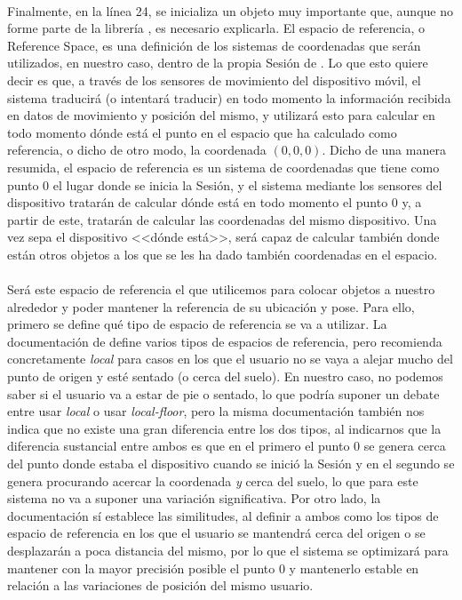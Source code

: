 \documentclass{subfiles}
\begin{document}
        \paragraph{}
        Finalmente, en la línea 24, se inicializa un objeto muy importante que, aunque no forme parte de la librería \threejs, es necesario explicarla. El espacio de referencia, o Reference Space, es una definición de los sistemas de coordenadas que serán utilizados, en nuestro caso, dentro de la propia Sesión de \ra \cite{web:webxr_referencespace}. Lo que esto quiere decir es que, a través de los sensores de movimiento del dispositivo móvil, el sistema traducirá (o intentará traducir) en todo momento la información recibida en datos de movimiento y posición del mismo, y utilizará esto para calcular en todo momento dónde está el punto en el espacio que ha calculado como referencia, o dicho de otro modo, la coordenada $(0,0,0)$. Dicho de una manera resumida, el espacio de referencia es un sistema de coordenadas que tiene como punto 0 el lugar donde se inicia la Sesión, y el sistema mediante los sensores del dispositivo tratarán de calcular dónde está en todo momento el punto 0 y, a partir de este, tratarán de calcular las coordenadas del mismo dispositivo. Una vez sepa el dispositivo <<dónde está>>, será capaz de calcular también donde están otros objetos a los que se les ha dado también coordenadas en el espacio.

        \paragraph{}
        Será este espacio de referencia el que utilicemos para colocar objetos a nuestro alrededor y poder mantener la referencia de su ubicación y pose. Para ello, primero se define qué tipo de espacio de referencia se va a utilizar. La documentación de \webxr define varios tipos de espacios de referencia, pero recomienda concretamente \textit{local} para casos en los que el usuario no se vaya a alejar mucho del punto de origen y esté sentado (o cerca del suelo). En nuestro caso, no podemos saber si el usuario va a estar de pie o sentado, lo que podría suponer un debate entre usar \textit{local} o usar \textit{local-floor}, pero la misma documentación también nos indica que no existe una gran diferencia entre los dos tipos, al indicarnos que la diferencia sustancial entre ambos es que en el primero el punto 0 se genera cerca del punto donde estaba el dispositivo cuando se inició la Sesión y en el segundo se genera procurando acercar la coordenada \textit{y} cerca del suelo, lo que para este sistema no va a suponer una variación significativa. Por otro lado, la documentación sí establece las similitudes, al definir a ambos como los tipos de espacio de referencia en los que el usuario se mantendrá cerca del origen o se desplazarán a poca distancia del mismo, por lo que el sistema se optimizará para mantener con la mayor precisión posible el punto 0 y mantenerlo estable en relación a las variaciones de posición del mismo usuario.
\end{document}
